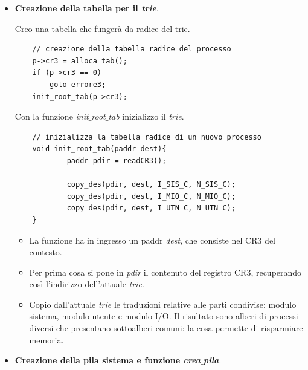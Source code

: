\documentclass[11pt]{report}
\theoremstyle{definition}
\begin{document}
\begin{itemize}
	\item \textbf{Creazione della tabella per il \emph{trie}}.
	
	Creo una tabella che fungerà da radice del trie. 
	\begin{verbatim}
	// creazione della tabella radice del processo
	p->cr3 = alloca_tab();
	if (p->cr3 == 0)
	    goto errore3;
	init_root_tab(p->cr3);
	\end{verbatim}
Con la funzione \emph{init$\_$root$\_$tab} inizializzo il \emph{trie}. 
\small
	\begin{verbatim}
	// inizializza la tabella radice di un nuovo processo
	void init_root_tab(paddr dest){
	    	paddr pdir = readCR3();
		
		    copy_des(pdir, dest, I_SIS_C, N_SIS_C);
		    copy_des(pdir, dest, I_MIO_C, N_MIO_C);
		    copy_des(pdir, dest, I_UTN_C, N_UTN_C);
	}
	\end{verbatim}
\normalsize
	\begin{itemize}
		\item La funzione ha in ingresso un paddr \emph{dest}, che consiste nel CR3 del contesto.
		\item Per prima cosa si pone in \emph{pdir} il contenuto del registro CR3, recuperando così l'indirizzo dell'attuale \emph{trie}.
		\item Copio dall'attuale \emph{trie} le traduzioni relative alle parti condivise: modulo sistema, modulo utente e modulo I/O. Il risultato sono alberi di processi diversi che presentano sottoalberi comuni: la cosa permette di risparmiare memoria.
	\end{itemize}
\item \textbf{Creazione della pila sistema e funzione \emph{crea$\_$pila}}.


\end{itemize}
\end{document}
